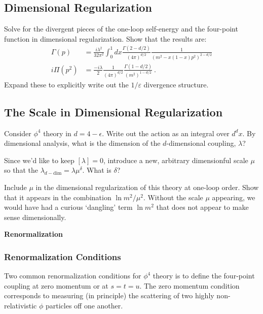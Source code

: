 \documentclass[12pt]{article}
\numberwithin{equation}{subsection}    %
\begin{document}
\subsection{Dimensional Regularization}

Solve for the divergent pieces of the one-loop self-energy and the four-point function in dimensional regularization. Show that the results are:
\begin{align}
	\Gamma(p) &= 
		\frac{i\lambda^2}{32\pi^2}
		\int_0^1 dx \frac{\Gamma(2-d/2)}{(4\pi)^{d/2}} \frac{1}{(m^2-x(1-x)p^2)^{2-d/2}}
		\\
	i\Pi(p^2) &= \frac{-i\lambda}{2} \frac{1}{(4\pi)^{d/2}} \frac{\Gamma(1-d/2)}{(m^2)^{1-d/2}} \ .
\end{align}
Expand these to explicitly write out the $1/\varepsilon$ divergence structure.


\subsection{The Scale in Dimensional Regularization}

Consider $\phi^4$ theory in $d=4-\epsilon$. Write out the action as an integral over $d^dx$. By dimensional analysis, what is the dimension of the $d$-dimensional coupling, $\lambda$? 

Since we'd like to keep $[\lambda] = 0$, introduce a new, arbitrary dimensionful scale $\mu$ so that the $\lambda_{d-\text{dim}} = \lambda \mu^\delta$. What is $\delta$?

Include $\mu$ in the dimensional regularization of this theory at one-loop order. Show that it appears in the combination $\ln m^2/\mu^2$. Without the scale $\mu$ appearing, we would have had a curious `dangling' term $\ln m^2$ that does not appear to make sense dimensionally.


\vspace{1em}
{\Large \bf \sffamily Renormalization}

\subsubsection{Renormalization Conditions}

Two common renormalization conditions for $\phi^4$ theory is to define the four-point coupling at zero momentum or at $s=t=u$. The zero momentum condition corresponds to measuring (in principle) the scattering of two highly non-relativistic $\phi$ particles off one another. 
\end{document}
